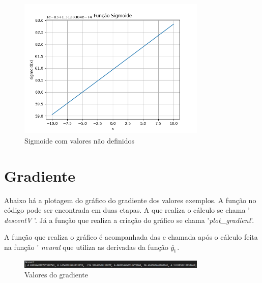 \documentclass{article}
\begin{document}
\begin{figure}
    \centering
    \includegraphics[width=0.8\textwidth]{Figure_3.png}
    \caption{Sigmoide com valores não definidos}
    \label{fig:sigmoide2}
\end{figure}
\newpage

\section{Gradiente}

\begin{flushleft}
Abaixo há a plotagem do gráfico do gradiente dos valores exemplos. A função no código pode ser encontrada em duas etapas. A que realiza o cálculo se chama '\textit{ descentV }'. Já a função que realiza a criação do gráfico se chama '\textit{plot\_gradient}'.
\end{flushleft}

\begin{flushleft}
A função que realiza o gráfico é acompanhada das e chamada após o cálculo feita na função '\textit{ neural } que utiliza as derivadas da função $\hat{y}_\textsubscript{i}$.
\end{flushleft}

\newpage
\begin{figure}
  \centering
  \includegraphics[width=0.8\textwidth]{Descent.jpg}
  \caption{Valores do gradiente}
  \label{fig:gradiente1}
\end{figure}
\newpage
\end{document}

